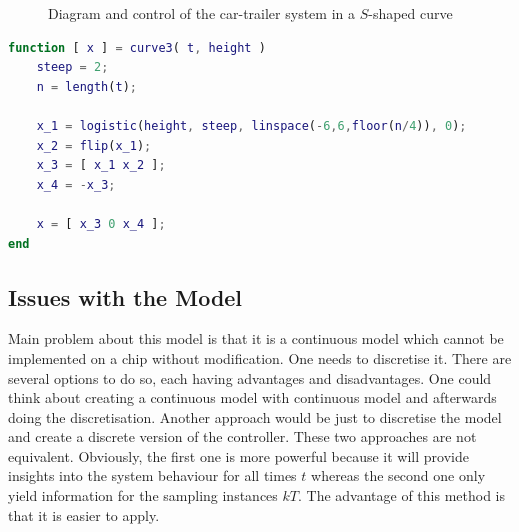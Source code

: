 \begin{figure}[H]
	\centering
	\hspace{0.5cm}%
	\caption{Diagram and control of the car-trailer system in a $S$-shaped curve}
\end{figure}
\begin{lstlisting}[language=matlab, label=sn:curve4, caption=Function used to simulate an $S$-shaped curve]
function [ x ] = curve3( t, height )
	steep = 2;
	n = length(t);

	x_1 = logistic(height, steep, linspace(-6,6,floor(n/4)), 0);
	x_2 = flip(x_1);
	x_3 = [ x_1 x_2 ];
	x_4 = -x_3;

	x = [ x_3 0 x_4 ];
end
\end{lstlisting}

\subsection{Issues with the Model}

Main problem about this model is that it is a continuous model which cannot be implemented on a chip without modification. One needs to discretise it. There are several options to do so, each having advantages and disadvantages. One could think about creating a continuous model with continuous model and afterwards doing the discretisation. Another approach would be just to discretise the model and create a discrete version of the controller. These two approaches are not equivalent. Obviously, the first one is more powerful because it will provide insights into the system behaviour for all times $t$ whereas the second one only yield information for the sampling instances $kT$. The advantage of this method is that it is easier to apply.

